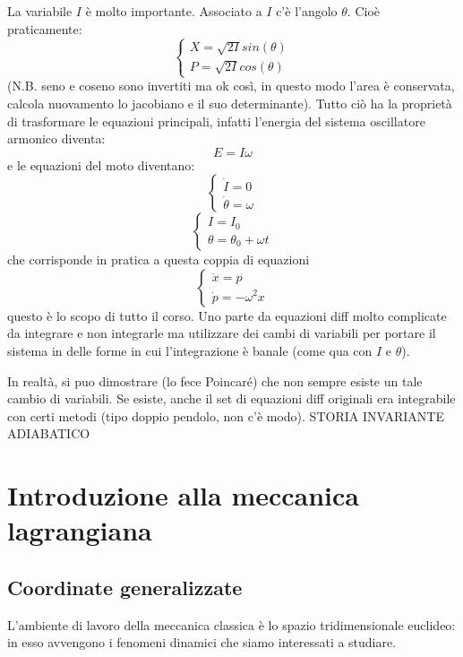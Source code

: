 \documentclass[a4paper,openany]{article}
\begin{document}
	La variabile $I$ è molto importante. Associato a $I$ c'è l'angolo $\theta$. Cioè praticamente:
	\begin{equation}
		\begin{cases}
			X = \sqrt{2I}sin(\theta) \\
			P = \sqrt{2I}cos(\theta)
		\end{cases}
	\end{equation}
	(N.B. seno e coseno sono invertiti ma ok così, in questo modo l'area è conservata, calcola nuovamento lo jacobiano e il suo determinante). Tutto ciò ha la proprietà di trasformare le equazioni principali, infatti l'energia del sistema oscillatore armonico diventa:
	$$
	E = I \omega
	$$
	e le equazioni del moto diventano:
	\begin{equation}
		\begin{cases}
			\dot{I} = 0 \\
			\dot{\theta} = \omega
		\end{cases}
	\end{equation}
	\begin{equation}
		\begin{cases}
			I = I_{0} \\
			\theta = \theta_{0} +\omega t
		\end{cases}
	\end{equation}
	che corrisponde in pratica a questa coppia di equazioni
	\begin{equation}
		\begin{cases}
			\dot{x} = p \\
			\dot{p} = -\omega^{2}x
		\end{cases}
	\end{equation}
	questo è lo scopo di tutto il corso. Uno parte da equazioni diff molto complicate da integrare e non integrarle ma utilizzare dei cambi di variabili per portare il sistema in delle forme in cui l'integrazione è banale (come qua con $I$ e $\theta$).
	
	In realtà, si puo dimostrare (lo fece Poincaré) che non sempre esiste un tale cambio di variabili. Se esiste, anche il set di equazioni diff originali era integrabile con certi metodi (tipo doppio pendolo, non c'è modo). STORIA INVARIANTE ADIABATICO
	
	
	
	\newpage
	\section{Introduzione alla meccanica lagrangiana}
	\subsection{Coordinate generalizzate}
	L'ambiente di lavoro della meccanica classica è lo spazio tridimensionale euclideo: in esso avvengono i fenomeni dinamici che siamo interessati a studiare.
	
\end{document}
